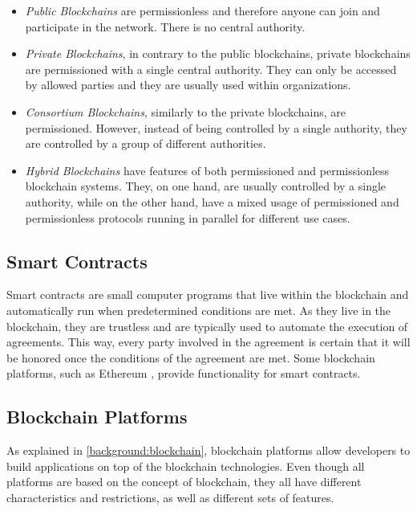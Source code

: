\begin{itemize}
    \item \textit{Public Blockchains} are permissionless and therefore anyone can join and participate in the network. There is no central authority.

    \item \textit{Private Blockchains}, in contrary to the public blockchains, private blockchains are permissioned with a single central authority. They can only be accessed by allowed parties and they are usually used within organizations.

    \item \textit{Consortium Blockchains}, similarly to the private blockchains, are permissioned. However, instead of being controlled by a single authority, they are controlled by a group of different authorities.

    \item \textit{Hybrid Blockchains} have features of both permissioned and permissionless blockchain systems. They, on one hand, are usually controlled by a single authority, while on the other hand, have a mixed usage of permissioned and permissionless protocols running in parallel for different use cases.
\end{itemize}

\subsection{Smart Contracts}\label{background:smart_contracts}

Smart contracts \cite{8500488} are small computer programs that live within the blockchain and automatically run when predetermined conditions are met. As they live in the blockchain, they are trustless and are typically used to automate the execution of agreements. This way, every party involved in the agreement is certain that it will be honored once the conditions of the agreement are met. Some blockchain platforms, such as Ethereum \cite{wood2014ethereum}, provide functionality for smart contracts.

\subsection{Blockchain Platforms}\label{background:blockchain_platforms}
 
As explained in \autoref{background:blockchain}, blockchain platforms allow developers to build applications on top of the blockchain technologies. Even though all platforms are based on the concept of blockchain, they all have different characteristics and restrictions, as well as different sets of features.

